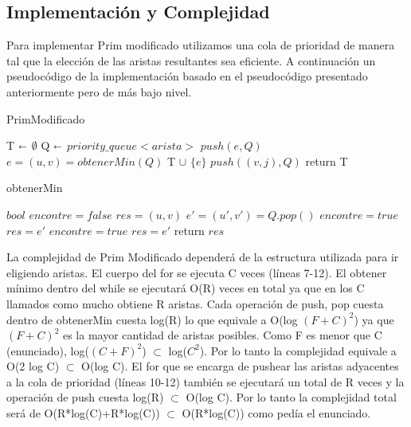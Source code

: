 \subsection{Implementación y Complejidad}

Para implementar Prim modificado utilizamos una cola de prioridad de manera tal que la elección de las aristas resultantes sea eficiente. A continuación un pseudocódigo de la implementación basado en el pseudocódigo presentado anteriormente pero de más bajo nivel.

\begin{algorithm}[H]
\caption{PrimModificado}\label{ej1}
\begin{algorithmic}[1]
	\State T  $\shortleftarrow$ $\emptyset$
	\State Q  $\shortleftarrow$ $priority\_queue<arista>$
	 
		\State $push(e,Q)$
	\EndFor
		\State $e=(u,v)=obtenerMin(Q)$
		\State T $\cup$ $\{e\}$
			\State $push((v,j),Q)$
		\EndFor
	\EndFor
	\State return T
\EndProcedure
\end{algorithmic}
\end{algorithm}

\begin{algorithm}[H]
\caption{obtenerMin}\label{ej1}
\begin{algorithmic}[1]
	\State $bool$ $encontre=false$
	\State $res=(u,v)$
	\State $e'=(u',v')=Q.pop()$
		\State $encontre=true$
		\State $res=e'$
	\Else
			\State $encontre=true$
			\State $res=e'$
		\EndIf
	\EndIf
	\EndWhile
	\State return $res$
\EndProcedure
\end{algorithmic}
\end{algorithm}

La complejidad de Prim Modificado dependerá de la estructura utilizada para ir eligiendo aristas. El cuerpo del for se ejecuta C veces (líneas 7-12). El obtener mínimo dentro del while se ejecutará O(R) veces en total ya que en los C llamados como mucho obtiene R aristas. Cada operación de push, pop cuesta dentro de obtenerMin cuesta log(R) lo que equivale a O(log $(F+C)^2$) ya que $(F+C)^2$ es la mayor cantidad de aristas posibles. Como F es menor que C (enunciado), log($(C+F)^2$) $\subset$ log($C^2$). Por lo tanto la complejidad equivale a O(2 log C) $\subset$ O(log C). El for que se encarga de pushear las aristas adyacentes a la cola de prioridad (líneas 10-12) también se ejecutará un total de R veces y la operación de push cuesta log(R) $\subset$ O(log C). Por lo tanto la complejidad total será de O(R*log(C)+R*log(C)) $\subset$ O(R*log(C)) como pedía el enunciado.
